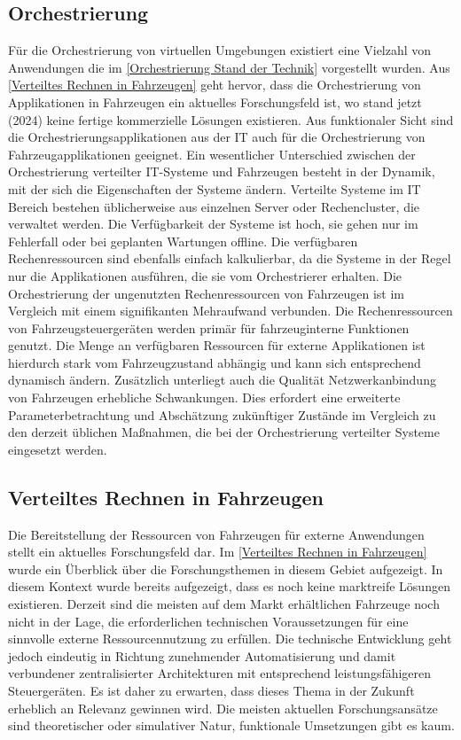 \subsection{Orchestrierung}
Für die Orchestrierung von virtuellen Umgebungen existiert eine Vielzahl von Anwendungen die im \autoref{Orchestrierung Stand der Technik} vorgestellt wurden. Aus \autoref{Verteiltes Rechnen in Fahrzeugen} geht hervor, dass die Orchestrierung von Applikationen in Fahrzeugen ein aktuelles Forschungsfeld ist, wo stand jetzt (2024) keine fertige kommerzielle Lösungen existieren. Aus funktionaler Sicht sind die Orchestrierungsapplikationen aus der IT auch für die Orchestrierung von Fahrzeugapplikationen geeignet. Ein wesentlicher Unterschied zwischen der Orchestrierung verteilter IT-Systeme und Fahrzeugen besteht in der Dynamik, mit der sich die Eigenschaften der Systeme ändern. Verteilte Systeme im IT Bereich bestehen üblicherweise aus einzelnen Server oder Rechencluster, die verwaltet werden. Die Verfügbarkeit der Systeme ist hoch, sie gehen nur im Fehlerfall oder bei geplanten Wartungen offline. Die verfügbaren Rechenressourcen sind ebenfalls einfach kalkulierbar, da die Systeme in der Regel nur die Applikationen ausführen, die sie vom Orchestrierer erhalten. Die Orchestrierung der ungenutzten Rechenressourcen von Fahrzeugen ist im Vergleich mit einem signifikanten Mehraufwand verbunden. Die Rechenressourcen von Fahrzeugsteuergeräten werden primär für fahrzeuginterne Funktionen genutzt. Die Menge an verfügbaren Ressourcen für externe Applikationen ist hierdurch stark vom Fahrzeugzustand abhängig und kann sich entsprechend dynamisch ändern. Zusätzlich unterliegt auch die Qualität Netzwerkanbindung von Fahrzeugen erhebliche Schwankungen. Dies erfordert eine erweiterte Parameterbetrachtung und Abschätzung zukünftiger Zustände im Vergleich zu den derzeit üblichen Maßnahmen, die bei der Orchestrierung verteilter Systeme eingesetzt werden.
 
\subsection{Verteiltes Rechnen in Fahrzeugen}

Die Bereitstellung der Ressourcen von Fahrzeugen für externe Anwendungen stellt ein aktuelles Forschungsfeld dar. Im \autoref{Verteiltes Rechnen in Fahrzeugen} wurde ein Überblick über die Forschungsthemen in diesem Gebiet aufgezeigt. In diesem Kontext wurde bereits aufgezeigt, dass es noch keine marktreife Lösungen existieren. Derzeit sind die meisten auf dem Markt erhältlichen Fahrzeuge noch nicht in der Lage, die erforderlichen technischen Voraussetzungen für eine sinnvolle externe Ressourcennutzung zu erfüllen. Die technische Entwicklung geht jedoch eindeutig in Richtung zunehmender Automatisierung und damit verbundener zentralisierter  Architekturen mit entsprechend leistungsfähigeren Steuergeräten. Es ist daher zu erwarten, dass dieses Thema in der Zukunft erheblich an Relevanz gewinnen wird. Die meisten aktuellen Forschungsansätze sind theoretischer oder simulativer Natur, funktionale Umsetzungen gibt es kaum. 

